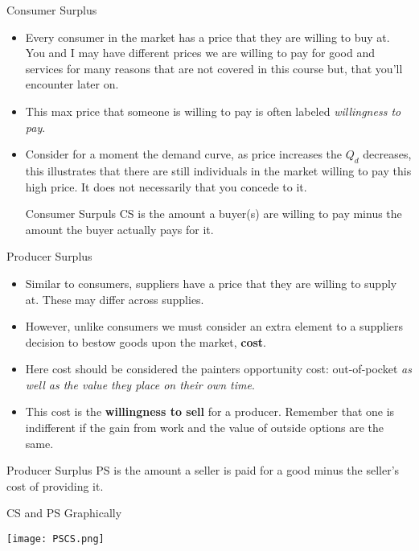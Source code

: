\documentclass[aspectratio=169]{beamer}
\begin{document}
\begin{frame}{Consumer Surplus}
    \begin{itemize}
        \item Every consumer in the market has a price that they are willing to buy at. You and I may have different prices we are willing to pay for good and services for many reasons that are not covered in this course but, that you'll encounter later on.
        \item This max price that someone is willing to pay is often labeled \textit{willingness to pay}.
        \item Consider for a moment the demand curve, as price increases the  $Q_d$ decreases, this illustrates that there are still individuals in the market willing to pay this high price. It does not necessarily that you concede to it.
        \begin{block}{Consumer Surpuls}
            CS is the amount a buyer(s) are willing to pay minus the amount the buyer actually pays for it.
        \end{block}
    \end{itemize}
\end{frame}

\begin{frame}{Producer Surplus}
    \begin{itemize}
    \item Similar to consumers, suppliers have a price that they are willing to supply at. These may differ across supplies.
    \item However, unlike consumers we must consider an extra element to a suppliers decision to bestow goods upon the market, \textbf{cost}.
    \item Here cost should be considered the painters opportunity cost: out-of-pocket \textit{as well as the value they place on their own time}.
    \item This cost is the \textbf{willingness to sell} for a producer. Remember that one is indifferent if the gain from work and the value of outside options are the same.
    \end{itemize}
    \begin{block}{Producer Surplus}
        PS is the amount a seller is paid for a good minus the seller's cost of providing it.
    \end{block}
\end{frame}

\begin{frame}{CS and PS Graphically}
    \begin{center}  
    \texttt{[image: PSCS.png]}
    \end{center}
\end{frame}
\end{document}

